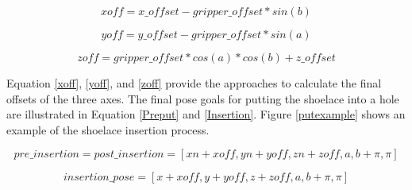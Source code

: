 \begin{equation}
xoff = x\_offset - gripper\_offset*sin(b)
\label{xoff}
\end{equation}

\begin{equation}
yoff = y\_offset - gripper\_offset*sin(a)
\label{yoff}
\end{equation}

\begin{equation}
zoff = gripper\_offset*cos(a)*cos(b) + z\_offset
\label{zoff}
\end{equation}

Equation \ref{xoff}, \ref{yoff}, and \ref{zoff} provide the approaches to calculate the final offsets of the three axes. The final pose goals for putting the shoelace into a hole are illustrated in Equation \ref{Preput} and \ref{Insertion}. Figure \ref{putexample} shows an example of the shoelace insertion process.

\begin{equation}
pre\_insertion = post\_insertion = [xn + xoff, yn + yoff, zn + zoff, a, b + \pi, \pi]
\label{Preput}
\end{equation} 

\begin{equation}
insertion\_pose = [x + xoff, y + yoff, z + zoff, a, b + \pi, \pi]
\label{Insertion}
\end{equation} 

